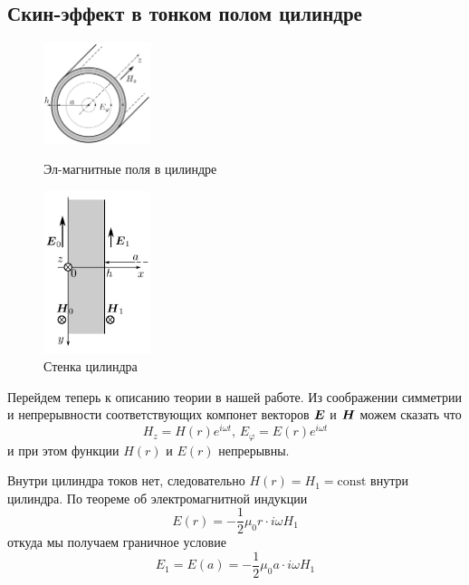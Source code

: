 \documentclass[a4paper,12pt]{article}
\begin{document}
\subsection{Скин-эффект в тонком полом цилиндре}
\vspace{1cm}
\begin{figure}
  \begin{center}
    \includegraphics[width=0.28\textwidth]{cilindr}
  \end{center}
  \caption{Эл-магнитные поля в цилиндре}\label{fig:cilindr}

  \begin{center}
    \includegraphics[width=0.28\textwidth]{stenka}
  \end{center}
  \caption{Стенка цилиндра}\label{fig:stenka}
\end{figure}

Перейдем теперь к описанию теории в нашей работе. Из соображении симметрии и 
непрерывности соответствующих компонет векторов $\vb*{E}$ и $\vb*{H}$ можем сказать что
\begin{equation*}
    H_z = H(r)e^{i\omega t} \text{, } E_\varphi = E(r)e^{i\omega t}
\end{equation*}
и при этом функции $H(r)$ и $E(r)$ непрерывны.

Внутри цилиндра токов нет, следовательно $H(r)=H_1=\text{const}$ внутри цилиндра.
По теореме об электромагнитной индукции
\begin{equation*}
    E(r) = -\frac{1}{2}\mu_0 r \cdot i \omega H_1
\end{equation*}
откуда мы получаем граничное условие
\begin{equation}
    E_1=E(a)= -\frac{1}{2}\mu_0 a \cdot i \omega H_1
    \label{eq:granichnoe_uslovie_E}
\end{equation}
\end{document}
